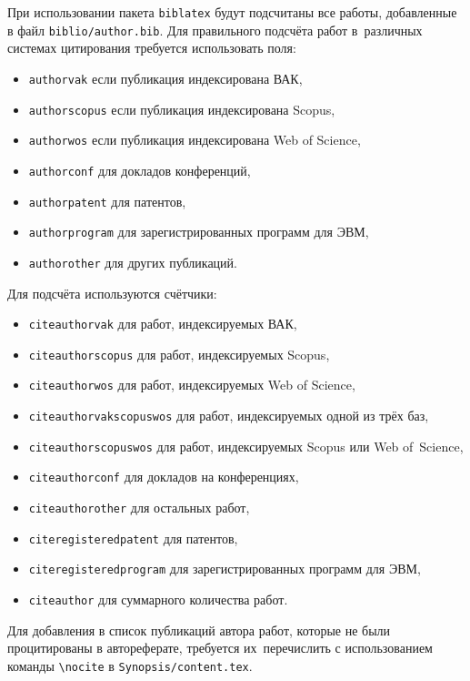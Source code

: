 {        %
    \ifsynopsis
    \fi
}

При использовании пакета \verb!biblatex! будут подсчитаны все работы, добавленные
в файл \verb!biblio/author.bib!. Для правильного подсчёта работ в~различных
системах цитирования требуется использовать поля:
\begin{itemize}
        \item \texttt{authorvak} если публикация индексирована ВАК,
        \item \texttt{authorscopus} если публикация индексирована Scopus,
        \item \texttt{authorwos} если публикация индексирована Web of Science,
        \item \texttt{authorconf} для докладов конференций,
        \item \texttt{authorpatent} для патентов,
        \item \texttt{authorprogram} для зарегистрированных программ для ЭВМ,
        \item \texttt{authorother} для других публикаций.
\end{itemize}
Для подсчёта используются счётчики:
\begin{itemize}
        \item \texttt{citeauthorvak} для работ, индексируемых ВАК,
        \item \texttt{citeauthorscopus} для работ, индексируемых Scopus,
        \item \texttt{citeauthorwos} для работ, индексируемых Web of Science,
        \item \texttt{citeauthorvakscopuswos} для работ, индексируемых одной из трёх баз,
        \item \texttt{citeauthorscopuswos} для работ, индексируемых Scopus или Web of~Science,
        \item \texttt{citeauthorconf} для докладов на конференциях,
        \item \texttt{citeauthorother} для остальных работ,
        \item \texttt{citeregisteredpatent} для патентов,
        \item \texttt{citeregisteredprogram} для зарегистрированных программ для ЭВМ,
        \item \texttt{citeauthor} для суммарного количества работ.
\end{itemize}

Для добавления в список публикаций автора работ, которые не были процитированы в
автореферате, требуется их~перечислить с использованием команды \verb!\nocite! в
\verb!Synopsis/content.tex!.
